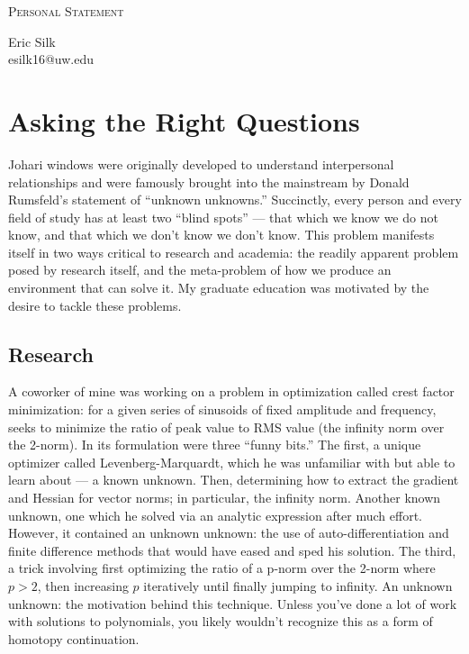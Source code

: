 \documentclass[letterpaper]{article}
\makeatletter
\newcommand{\soptitle}{Personal Statement}
\newcommand{\yourname}{Eric Silk}
\newcommand{\youremail}{esilk16@uw.edu}
\makeatother
\begin{document}
\begin{center}{\huge \scshape \soptitle}\end{center}
\begin{center}\vspace{0.2em} {\Large \yourname\\}
  {\youremail}\end{center}
\frenchspacing



\section*{Asking the Right Questions}
Johari windows were originally developed to
understand interpersonal relationships and were famously brought into the mainstream
by Donald Rumsfeld's statement of ``unknown unknowns.'' Succinctly, every person and
every field of study has at least two ``blind spots'' --- that which we know we do not
know, and that which we don't know we don't know. This problem manifests itself in two ways
critical to research and academia: the readily apparent problem posed by research itself,
and the meta-problem of how we produce an environment that can solve it. My graduate education
was motivated by the desire to tackle these problems.

\subsection*{Research}
A coworker of mine was working on a problem in optimization called crest factor minimization: for
a given series of sinusoids of fixed amplitude and frequency, seeks to minimize the ratio of peak
value to RMS value (the infinity norm over the 2-norm). In its formulation were three ``funny bits.''
The first, a unique optimizer called Levenberg-Marquardt, which he was unfamiliar with but able to
learn about --- a known unknown. Then, determining how to extract the gradient and Hessian for
vector norms; in particular, the infinity norm. Another known unknown, one which he solved via
an analytic expression after much effort. However, it contained an unknown unknown: the
use of auto-differentiation and finite difference methods that would have eased and sped his
solution. The third, a trick involving first optimizing the ratio of a p-norm over the 2-norm where
$p>2$, then increasing $p$ iteratively until finally jumping to infinity. An unknown unknown:
the motivation behind this technique. Unless you've done a lot of work with solutions to polynomials, you likely
wouldn't recognize this as a form of homotopy continuation.
\end{document}
